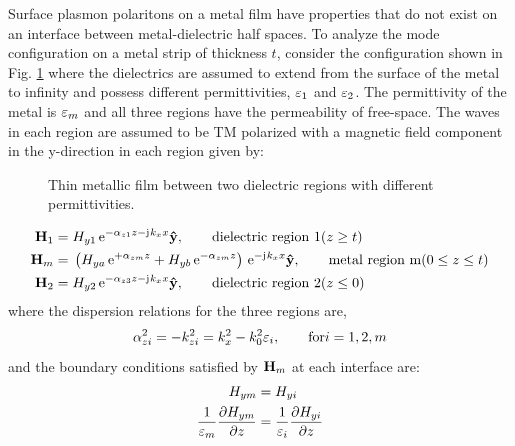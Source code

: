 \documentclass[11pt]{article}
\begin{document}
Surface plasmon polaritons on a metal film have properties that do not exist on an interface between metal-dielectric half spaces. To analyze the mode configuration on a metal strip of thickness $t$, consider the configuration shown in Fig. \ref{fig:3layer} where the dielectrics are assumed to extend from the surface of the metal to infinity and possess different permittivities, $\varepsilon_1$ and $\varepsilon_2$. The permittivity of the metal is $\varepsilon_m$ and all three regions have the permeability of free-space. The waves in each region are assumed to be TM polarized with a magnetic field component in the y-direction in each region given by:
%
\begin{figure}[b!]
  \centering
  \def\svgwidth{.75\linewidth}
  
  \caption{Thin metallic film between two dielectric regions with different permittivities.}
  \label{fig:3layer}
\end{figure}
%
\begin{subequations}
  \begin{align}
    \v H_1 ={}& H_{y1} \, \e^{ -\A_{z1}z - \j k_x x}\v{\^{y}}, \qquad	 		\text{dielectric region 1} (z \ge t)
    \label{eq:H1_3layer}\\
    \v H_m ={}& \left( H_{ya}\, \e^{ +\A_{zm}z} + H_{yb}\, \e^{ -\A_{zm}z} \right) \, \e^{ - \j k_x x}\v{\^{y}}, \qquad	 		\text{metal region m} (0 \le z \le t)
    \label{eq:Hm_3layer}\\
    \v H_2 ={}& H_{y2} \, \e^{ -\A_{z3}z - \j k_x x}\v{\^{y}}, \qquad	 		\text{dielectric region 2} (z \le 0)
    \label{eq:H2_3layer}\\
  \end{align}
  \label{eq:H_3layer}\\
\end{subequations}
%
where the dispersion relations for the three regions are,
%
\begin{equation}
  \alpha_{zi}^2 = -k_{zi}^2 = k_x^2 - k_0^2 \varepsilon_i, \qquad	  \text{for}
  i=1,2,m
  \label{eq:3_layer_disp}
\end{equation}
%
and the boundary conditions satisfied by $\mathbf{H}_m$ at each interface are:
%
\begin{subequations}
  \begin{align}
    {H_{ym}} ={}& {H_{yi}}
    \label{eq:bc1_3layer}\\
    \frac{1}{\varepsilon_m}\pdv{H_{ym}}{z}  ={}& \frac{1}{\varepsilon_i}\pdv{H_{yi}}{z}
    \label{eq:bc2_3layer}
  \end{align}
  \label{eq:bc_3layer}
\end{subequations}
\end{document}
